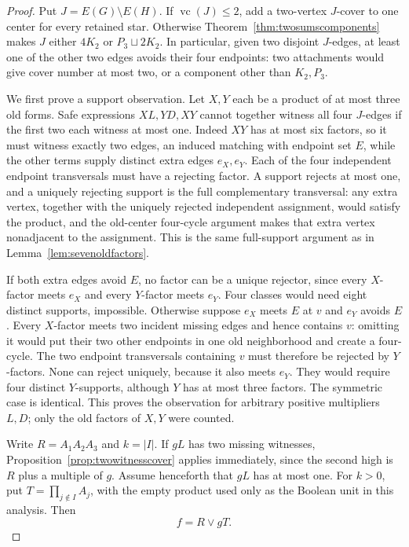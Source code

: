 \documentclass[11pt]{article}
\newcommand{\vc}{\operatorname{vc}}
\theoremstyle{definition}
\theoremstyle{remark}
\begin{document}
\begin{proof}
Put $J=E(G)\setminus E(H)$. If $\vc(J)\le2$, add a two-vertex
$J$-cover to one center for every retained star. Otherwise
Theorem~\ref{thm:twosumscomponents} makes $J$ either $4K_2$ or
$P_3\sqcup2K_2$. In particular, given two disjoint $J$-edges, at least one
of the other two edges avoids their four endpoints: two attachments would
give cover number at most two, or a component other than $K_2,P_3$.

We first prove a support observation. Let $X,Y$ each be a product of at
most three old forms. Safe expressions $XL,YD,XY$ cannot together witness
all four $J$-edges if the first two each witness at most one. Indeed $XY$
has at most six factors, so it must witness exactly two edges, an induced
matching with endpoint set $E$, while the other terms supply distinct
extra edges $e_X,e_Y$. Each of the four independent endpoint transversals
must have a rejecting factor. A support rejects at most one, and a
uniquely rejecting support is the full complementary transversal: any
extra vertex, together with the uniquely rejected independent assignment,
would satisfy the product, and the old-center four-cycle argument makes
that extra vertex nonadjacent to the assignment. This is the same
full-support argument as in Lemma~\ref{lem:sevenoldfactors}.

If both extra edges avoid $E$, no factor can be a unique rejector, since
every $X$-factor meets $e_X$ and every $Y$-factor meets $e_Y$. Four classes
would need eight distinct supports, impossible. Otherwise suppose $e_X$
meets $E$ at $v$ and $e_Y$ avoids $E$. Every $X$-factor meets two incident
missing edges and hence contains $v$: omitting it would put their two
other endpoints in one old neighborhood and create a four-cycle. The
two endpoint transversals containing $v$ must therefore be rejected by
$Y$-factors. None can reject uniquely, because it also meets $e_Y$.
They would require four distinct $Y$-supports, although $Y$ has at most
three factors. The symmetric case is identical. This proves the observation
for arbitrary positive multipliers $L,D$; only the old factors of $X,Y$
were counted.

Write $R=A_1A_2A_3$ and $k=|I|$. If $gL$ has two missing witnesses,
Proposition~\ref{prop:twowitnesscover} applies immediately, since the
second high is $R$ plus a multiple of $g$. Assume henceforth that $gL$
has at most one. For $k>0$, put $T=\prod_{j\notin I}A_j$, with the
empty product used only as the Boolean unit in this analysis. Then
\[
 f=R\vee gT.
\]


\end{proof}
\end{document}
